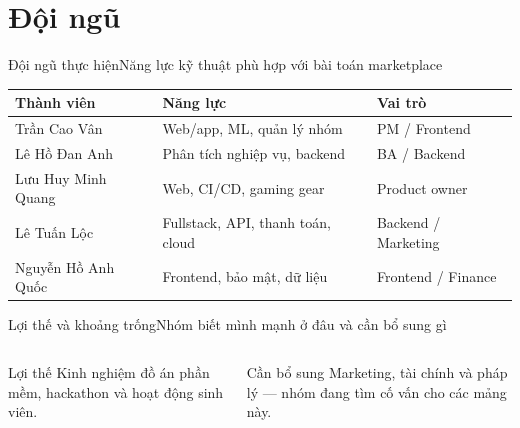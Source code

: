 \section{Đội ngũ}

\begin{frame}{Đội ngũ thực hiện}{Năng lực kỹ thuật phù hợp với bài toán marketplace}
  \vspace{.6em}
  \small
  \begin{tabularx}{.9\textwidth}{@{}lXl@{}}
    \toprule
    \textbf{Thành viên} & \textbf{Năng lực} & \textbf{Vai trò} \\
    \midrule
    Trần Cao Vân & Web/app, ML, quản lý nhóm & PM / Frontend \\
    Lê Hồ Đan Anh & Phân tích nghiệp vụ, backend & BA / Backend \\
    Lưu Huy Minh Quang & Web, CI/CD, gaming gear & Product owner \\
    Lê Tuấn Lộc & Fullstack, API, thanh toán, cloud & Backend / Marketing \\
    Nguyễn Hồ Anh Quốc & Frontend, bảo mật, dữ liệu & Frontend / Finance \\
    \bottomrule
  \end{tabularx}
\end{frame}

\begin{frame}{Lợi thế và khoảng trống}{Nhóm biết mình mạnh ở đâu và cần bổ sung gì}
  \vspace{1.2em}
  \begin{columns}[T,onlytextwidth]
      \begin{exampleblock}{Lợi thế}
        Kinh nghiệm đồ án phần mềm, hackathon và hoạt động sinh viên.
      \end{exampleblock}
      \begin{block}{Cần bổ sung}
        Marketing, tài chính và pháp lý --- nhóm đang tìm cố vấn cho các mảng này.
      \end{block}
  \end{columns}
\end{frame}
